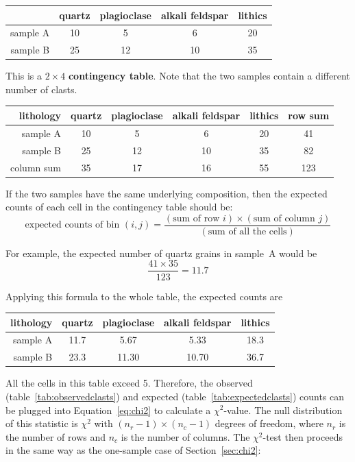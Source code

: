 \begin{center}
  \begin{tabular}{r|cccc}
~ & quartz & plagioclase & alkali feldspar & lithics \\ \hline
sample A & 10 & 5 & 6 & 20 \\
sample B & 25 & 12 & 10 & 35
  \end{tabular}
  \label{tab:observedclasts}
\end{center}

This is a ${2}\times{4}$ \textbf{contingency table}. Note that the two
samples contain a different number of clasts.

\begin{center}
  \begin{tabular}{r|cccc|c}
lithology & quartz & plagioclase & alkali feldspar & lithics & row sum \\ \hline
sample A & 10 & 5 & 6 & 20 & 41\\
sample B & 25 & 12 & 10 & 35 & 82 \\ \hline
column sum & 35 & 17 & 16 & 55 & 123
  \end{tabular}
\end{center}

If the two samples have the same underlying composition, then the
expected counts of each cell in the contingency table should be:
\[
\mbox{expected counts of bin }(i,j) =
\frac{(\mbox{sum of row }i)\times(\mbox{sum of column }j)}
     {(\mbox{sum of all the cells})}
\]

For example, the expected number of quartz grains in sample~A would be
\[
\frac{41\times35}{123}=11.7
\]

Applying this formula to the whole table, the expected counts are

\begin{center}
  \begin{tabular}{r|cccc}
lithology & quartz & plagioclase & alkali feldspar & lithics \\ \hline
sample A & 11.7 & 5.67 & 5.33 & 18.3 \\
sample B & 23.3 & 11.30 & 10.70 & 36.7
  \end{tabular}
  \label{tab:expectedclasts}
\end{center}

All the cells in this table exceed 5. Therefore, the observed
(table~\ref{tab:observedclasts}) and expected
(table~\ref{tab:expectedclasts}) counts can be plugged into
Equation~\ref{eq:chi2} to calculate a $\chi^2$-value. The null
distribution of this statistic is $\chi^2$ with $(n_r-1)\times(n_c-1)$
degrees of freedom, where $n_r$ is the number of rows and $n_c$ is the
number of columns.  The $\chi^2$-test then proceeds in the same way as
the one-sample case of Section~\ref{sec:chi2}:

